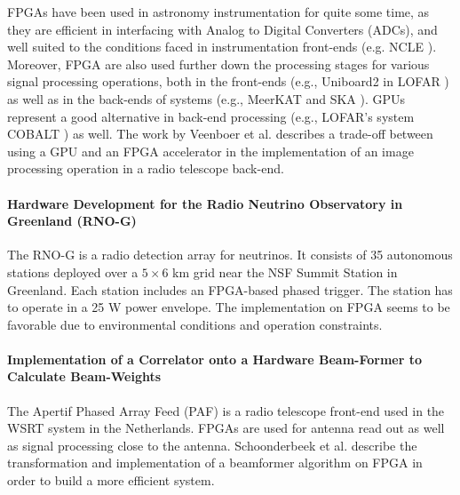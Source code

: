 
FPGAs have been used in astronomy instrumentation for quite some time, as they 
are %
efficient in interfacing with Analog to Digital Converters (ADCs), and well suited to the conditions faced in instrumentation front-ends (e.g. NCLE \cite{karapakula2024ncle}). Moreover, FPGA are also used further down the processing stages for various signal processing operations, both in the front-ends (e.g., Uniboard2 in LOFAR \cite{doi:10.1142/S225117171950003X}) as well as in the back-ends of systems (e.g., MeerKAT \cite{2022JATIS...8a1006V} and SKA \cite{SKA-CBF}). GPUs represent a good alternative in back-end processing (e.g., LOFAR's system COBALT \cite{Broekema_2018}) as well. The work by Veenboer et al. \cite{10.1007/978-3-030-29400-7_36} describes a trade-off between using a GPU and an FPGA accelerator in the implementation of an image processing operation in a radio telescope back-end.

\paragraph{Hardware Development for the Radio Neutrino Observatory in Greenland (RNO-G)}
The RNO-G \cite{Smith2022HardwareRNO-G} is a radio detection array for neutrinos. It consists of 35 autonomous stations deployed over a $5 \times 6$ km grid near the NSF Summit Station
in Greenland. Each station includes an FPGA-based phased trigger. The station has to operate in a 25 W power envelope. The implementation on FPGA seems to be favorable due to environmental conditions and operation constraints.

\paragraph{Implementation of a Correlator onto a Hardware Beam-Former to Calculate Beam-Weights}
The Apertif Phased Array Feed (PAF) \cite{van_Cappellen_2022} is a radio telescope front-end used in the WSRT system in the Netherlands. FPGAs are used for antenna read out as well as signal processing close to the antenna. Schoonderbeek et al. \cite{Schoonderbeek2020ImplementationBeam-Weights} describe the transformation and implementation of a beamformer algorithm on FPGA in order to build a more efficient system.

